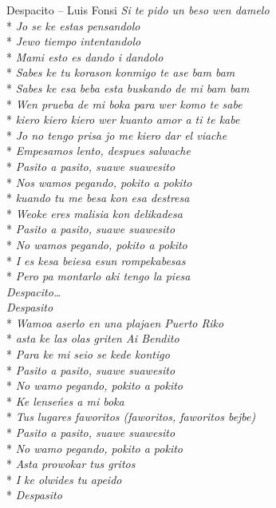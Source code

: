 \begin{piosenka_dluga}{Despacito -- Luis Fonsi}
\textit{Si te pido un beso wen damelo} \\*
\textit{Jo se ke estas pensandolo} \\*
\textit{Jewo tiempo intentandolo} \\*
\textit{Mami esto es dando i dandolo} \\*
\textit{Sabes ke tu korason konmigo te ase bam bam} \\*
\textit{Sabes ke esa beba esta buskando de mi bam bam} \\*
\textit{Wen prueba de mi boka para wer komo te sabe} \\*
\textit{kiero kiero kiero wer kuanto amor a ti te kabe} \\*
\textit{Jo no tengo prisa jo me kiero dar el viache} \\*
\textit{Empesamos lento, despues salwache} \\*
\textit{Pasito a pasito, suawe suawesito} \\*
\textit{Nos wamos pegando, pokito a pokito} \\*
\textit{kuando tu me besa kon esa destresa} \\*
\textit{Weoke eres malisia kon delikadesa} \\*
\textit{Pasito a pasito, suawe suawesito} \\*
\textit{No wamos pegando, pokito a pokito} \\*
\textit{I es kesa beiesa esun rompekabesas} \\*
\textit{Pero pa montarlo aki tengo la piesa} \\[\zwrotkaspace]

\textit{ Despacito\ldots} \\[\zwrotkaspace]

\textit{Despasito} \\*
\textit{Wamoa aserlo en una plajaen Puerto Riko} \\*
\textit{asta ke las olas griten Ai Bendito} \\*
\textit{Para ke mi seio se kede kontigo} \\*
\textit{Pasito a pasito, suawe suawesito} \\*
\textit{No wamo pegando, pokito a pokito} \\*
\textit{Ke lenseńes a mi boka} \\*
\textit{Tus lugares faworitos (faworitos, faworitos bejbe)} \\*
\textit{Pasito a pasito, suawe suawesito} \\*
\textit{No wamo pegando, pokito a pokito} \\*
\textit{Asta prowokar tus gritos} \\*
\textit{I ke olwides tu apeido} \\*
\textit{Despasito} \\[\zwrotkaspace] 

\end{piosenka_dluga}